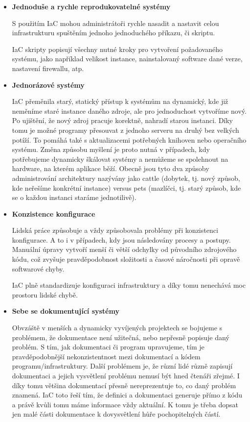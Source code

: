 \documentclass[thesis=M,czech]{FITthesis}[2019/12/23]
\theoremstyle{plain}
\theoremstyle{definition}
\begin{document}
\begin{itemize}  

	\item \textbf{Jednoduše a rychle reprodukovatelné systémy}

	S použitím IaC mohou administrátoři rychle nasadit a nastavit celou infrastrukturu spuštěním jednoho jednoduchého příkazu, či skriptu.

	IaC skripty popisují všechny nutné kroky pro vytvoření požadovaného systému, jako například velikost instance, nainstalovaný software dané verze, nastavení firewallu, atp.

	\item \textbf{Jednorázové systémy} 

	IaC přeměnila starý, statický přístup k systémům na dynamický, kde již neměníme staré instance daného zdroje, ale pro jednoduchost vytvoříme nový. Po ujištění, že nový zdroj pracuje korektně, nahradí starou instanci. Díky tomu je možné programy přesouvat z jednoho serveru na druhý bez velkých potíží. To pomáhá také s aktualizacemi potřebných knihoven nebo operačního systému. Změna způsobu myšlení je proto nutná v případech, kdy potřebujeme dynamicky škálovat systémy a nemůžeme se spolehnout na hardware, na kterém aplikace běží. Obecně jsou tyto dva způsoby administrování architektury nazývány jako cattle (dobytek, tj. nový způsob, kde neřešíme konkrétní instance) versus pets (mazlíčci, tj. starý způsob, kde se o každou instanci staráme jednotilivě). \cite{cattle-pets}

	\item \textbf{Konzistence konfigurace} 

	Lidská práce způsobuje a vždy způsobovala problémy při konzistenci konfigurace. A to i v případech, kdy jsou následovány procesy a postupy. Manuální úpravy vytvoří menší či větší odchylky od původního zdrojového kódu, což zvyšuje pravděpodobnost složitosti a časové náročnosti při opravě softwarové chyby. 

	IaC plně standardizuje konfiguraci infrastruktury a díky tomu nenechává moc prostoru lidské chybě.

	\item \textbf{Sebe se dokumentující systémy} 

	Obvzáště v menších a dynamicky vyvíjených projektech se bojujeme s problémem, že dokumentace není užitečná, nebo nepřesně popisuje daný problém. S tím, jak dokumentaci či program upravujeme, tím je pravděpodobnější nekonzistentnost mezi  dokumentací a kódem programu/infrastruktury. Další problémem je, že různí lidé různě zapisují dokumentaci a jejich vysvětlení problému nemusí být hned čtenáři zřejmé. I díky tomu většina dokumentací přesně nereprezentuje to, co daný problém znamená. IaC toto řeší tím, že definici a dokumentaci generuje přímo z kódu a právě kvůli tomu máme informace vždy aktuální. K tomu je třeba dopsat jen malé části dokumentace k dovysvětlení hůře pochopitelných částí.  


\end{itemize}
\end{document}
